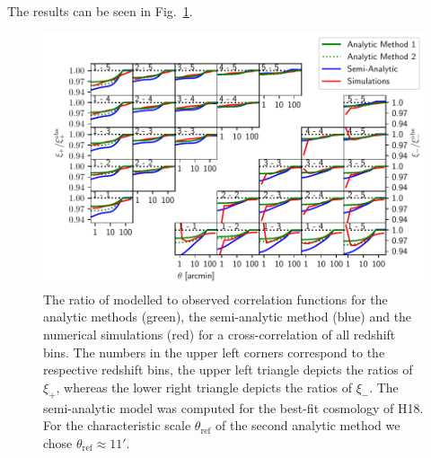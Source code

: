 \documentclass{aa}
\renewcommand{\rm}{\mathrm}
\begin{document}
The results can be seen in Fig.~\ref{fig:all_xis}.
  \begin{figure}
  \centering
  \includegraphics[width=0.9\linewidth]{images/xis_all1.pdf}
  \caption{The ratio of modelled to observed correlation functions for the analytic methods (green), the semi-analytic method (blue) and the numerical simulations (red) for a cross-correlation of all redshift bins. The numbers in the upper left corners correspond to the respective redshift bins, the upper left triangle depicts the ratios of $\xi_+$, whereas the lower right triangle depicts the ratios of $\xi_-$. The semi-analytic model was computed for the best-fit cosmology of H18. For the characteristic scale $\theta_{\rm{ref}}$ of the second analytic method we chose $\theta_{\rm{ref}} \approx 11'$.}
  \label{fig:all_xis}
  \end{figure}
\end{document}
